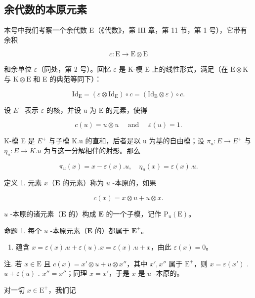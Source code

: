 \subsection{余代数的本原元素}

本号中我们考察一个余代数 E（《代数》，第 III 章，第 11 节，第 1 号），它带有余积

\[
c \colon \mathrm{E} \rightarrow \mathrm{E} \otimes \mathrm{E}
\]

和余单位 \(\varepsilon\)（同处，第 2 号）。回忆 \(\varepsilon\) 是 K-模 E 上的线性形式，满足（在 \(\mathrm{E} \otimes \mathrm{K}\) 与 \(\mathrm{K} \otimes \mathrm{E}\) 和 E 的典范等同下）：

\[
\mathrm{Id} _ {\mathrm{E}} = (\varepsilon \otimes \mathrm{Id} _ {\mathrm{E}}) \circ c = (\mathrm{Id} _ {\mathrm{E}} \otimes \varepsilon) \circ c.
\]

设 \(E^{+}\) 表示 \(\varepsilon\) 的核，并设 u 为 E 的元素，使得

\[
c (u) = u \otimes u \quad \text { and } \quad \varepsilon (u) = 1.
\]

K-模 E 是 \(E^{+}\) 与子模 K.u 的直和，后者是以 u 为基的自由模；设 \(\pi_{u}: E \to E^{+}\) 与 \(\eta_{u}: E \to K.u\) 为与这一分解相伴的射影。那么

\[
\pi_ {u} (x) = x - \varepsilon (x). u, \quad \eta_ {u} (x) = \varepsilon (x). u.\tag{1}
\]

定义 1. 元素 \(x\)（\(\mathbf{E}\) 的元素）称为 \(u\) -本原的，如果

\[
c (x) = x \otimes u + u \otimes x.\tag{2}
\]

\(u\) -本原的诸元素（\(\mathbf{E}\) 的）构成 \(\mathbf{E}\) 的一个子模，记作 \(\mathrm{P}_{u}(\mathrm{E})\)。

命题 1. 每个 \(u\) -本原元素（\(\mathbf{E}\) 的）都属于 \(\mathbf{E}^{+}\)。

\begin{enumerate}
\def\labelenumi{(\arabic{enumi})}
\setcounter{enumi}{1}
\tightlist
\item
  蕴含 \(x = \varepsilon(x).u + \varepsilon(u).x = \varepsilon(x).u + x\)，由此 \(\varepsilon(x) = 0\)。
\end{enumerate}

注. 若 \(x \in \mathrm{E}\) 且 \(c(x) = x' \otimes u + u \otimes x''\)，其中 \(x', x''\) 属于 \(\mathrm{E}^+\)，则 \(x = \varepsilon(x')\) . \(u + \varepsilon(u)\) . \(x'' = x''\)；同理 \(x = x'\)，于是 \(x\) 是 \(u\) -本原的。

对一切 \(x \in \mathrm{E}^{+}\)，我们记


